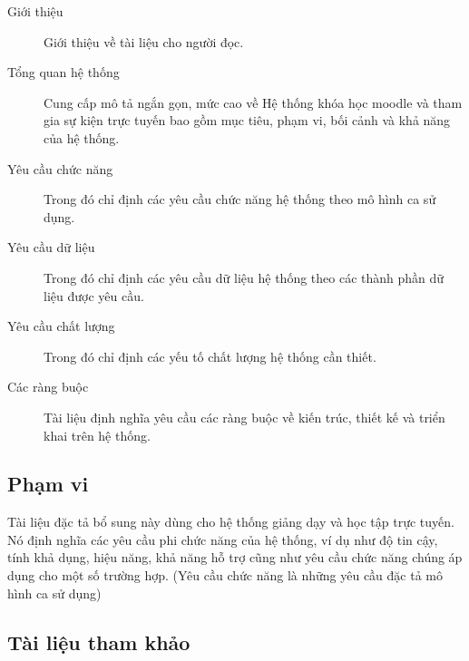 \documentclass[./../main_file.tex]{subfiles}
\begin{document}
	\begin{description}
		\item[Giới thiệu] Giới thiệu về tài liệu cho người đọc.
		\item[Tổng quan hệ thống] Cung cấp mô tả ngắn gọn, mức cao về Hệ thống khóa học moodle và tham gia sự kiện trực tuyến bao gồm mục tiêu, phạm vi, bối cảnh và khả năng của hệ thống.
		\item[Yêu cầu chức năng] Trong đó chỉ định các yêu cầu chức năng hệ thống theo mô hình ca sử dụng.
		\item[Yêu cầu dữ liệu] Trong đó chỉ định các yêu cầu dữ liệu hệ thống theo các thành phần dữ liệu được yêu cầu.
		\item[Yêu cầu chất lượng] Trong đó chỉ định các yếu tố chất lượng hệ thống cần thiết.
		\item[Các ràng buộc] Tài liệu định nghĩa yêu cầu các ràng buộc về kiến trúc, thiết kế và triển khai trên hệ thống.
		
	\end{description}
	
	\subsection{Phạm vi}
	Tài liệu đặc tả bổ sung này dùng cho hệ thống giảng dạy và học tập trực tuyến. Nó định nghĩa các yêu cầu phi chức năng của hệ thống, ví dụ như độ tin cậy, tính khả dụng, hiệu năng, khả năng hỗ trợ cũng như yêu cầu chức năng chúng áp dụng cho một số trường hợp. (Yêu cầu chức năng là những yêu cầu đặc tả mô hình ca sử dụng)
	
	\subsection{Tài liệu tham khảo}

	
\end{document}
